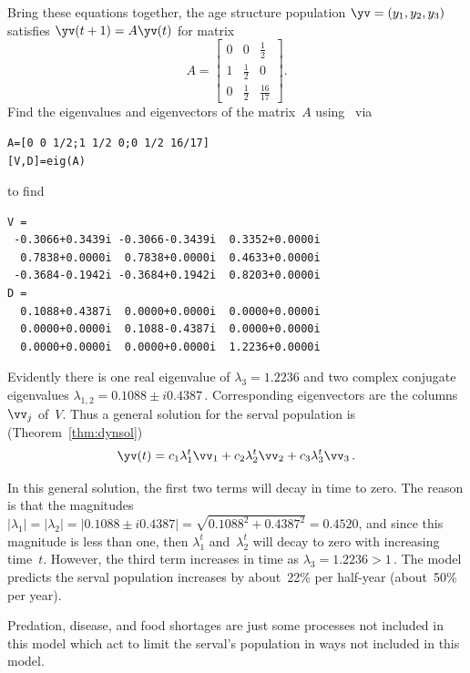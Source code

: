 \begin{example}
\begin{solution}
Bring these equations together, the age structure population \(\yv=(y_1,y_2,y_3)\) satisfies \(\yv(t+1)=A\yv(t)\) for matrix
\begin{equation*}
A=\begin{bmatrix} 0&0&\frac1{2}
\\1&\frac12&0
\\0&\frac12&\frac{16}{17} \end{bmatrix}.
\end{equation*}
Find the eigenvalues and eigenvectors of the matrix~\(A\) using \script\ via
\begin{verbatim}
A=[0 0 1/2;1 1/2 0;0 1/2 16/17]
[V,D]=eig(A)
\end{verbatim}
\setbox\ajrqrbox\hbox{}%
\marginpar{\usebox{\ajrqrbox}}%
to find
\begin{verbatim}
V =
 -0.3066+0.3439i -0.3066-0.3439i  0.3352+0.0000i
  0.7838+0.0000i  0.7838+0.0000i  0.4633+0.0000i
 -0.3684-0.1942i -0.3684+0.1942i  0.8203+0.0000i
D =
  0.1088+0.4387i  0.0000+0.0000i  0.0000+0.0000i
  0.0000+0.0000i  0.1088-0.4387i  0.0000+0.0000i
  0.0000+0.0000i  0.0000+0.0000i  1.2236+0.0000i
\end{verbatim}
Evidently there is one real eigenvalue of \(\lambda_3=1.2236\) and two complex conjugate eigenvalues \(\lambda_{1,2}=0.1088\pm i0.4387\)\,.
Corresponding eigenvectors are the columns~\(\vv_j\) of~\(V\).
Thus a general solution for the serval population is (Theorem~\ref{thm:dynsol})
\begin{equation*}
\yv(t)=c_1\lambda_1^t\vv_1+c_2\lambda_2^t\vv_2+c_3\lambda_3^t\vv_3\,.
\end{equation*}

In this general solution, the first two terms will decay in time to zero.
The reason is that the magnitudes \(|\lambda_1|=|\lambda_2|=|0.1088\pm i0.4387|=\sqrt{0.1088^2+0.4387^2}=0.4520\), and since this magnitude is less than one, then \(\lambda_1^t\) and~\(\lambda_2^t\) will decay to zero with increasing time~\(t\).
However, the third term increases in time as \(\lambda_3=1.2236>1\)\,.
The model predicts the serval population increases by about~22\% per half-year (about~50\% per year).
\end{solution} 
Predation, disease, and food shortages are just some processes not included in this model which act to limit the serval's population in ways not included in this model.
\end{example}





